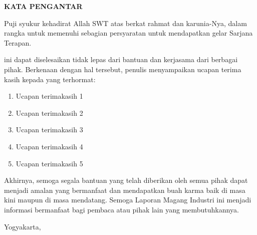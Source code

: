 \clearpage
{}
{}
\begin{center}
    \textbf{\large KATA PENGANTAR}\\[3em]
\end{center}

Puji syukur kehadirat Allah SWT atas berkat rahmat dan karunia-Nya, {\tipe} dalam rangka untuk memenuhi sebagian persyaratan untuk mendapatkan gelar Sarjana Terapan.

{\tipe} ini dapat diselesaikan tidak lepas dari bantuan dan kerjasama dari berbagai pihak. Berkenaan dengan hal tersebut, penulis menyampaikan ucapan terima kasih kepada yang terhormat:

\begin{enumerate}
    \item Ucapan terimakasih 1
    \item Ucapan terimakasih 2
    \item Ucapan terimakasih 3
    \item Ucapan terimakasih 4
    \item Ucapan terimakasih 5
\end{enumerate}

Akhirnya, semoga segala bantuan yang telah diberikan oleh semua pihak dapat menjadi amalan yang bermanfaat dan mendapatkan buah karma baik di masa kini maupun di masa mendatang. Semoga Laporan Magang Industri ini menjadi informasi bermanfaat bagi pembaca atau pihak lain yang membutuhkannya.

\begin{flushright}
    Yogyakarta, \tglpengesahan\\[1.25cm]
    {\underline{{\penulis}}} \\
    \nim
\end{flushright}